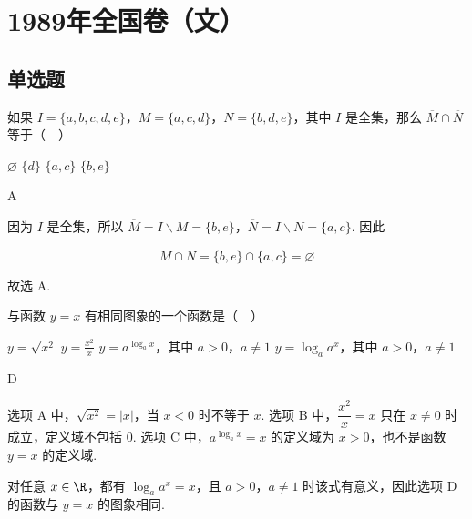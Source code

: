 \documentclass[UTF8,a4paper,oneside,11pt]{ctexbook}
\begin{document}
\mainmatter

\chapter{1989年全国卷（文）}

\section{单选题}

\begin{problem}
如果 \(I = \{a, b, c, d, e\}\)，\(M = \{a, c, d\}\)，\(N = \{b, d, e\}\)，其中 \(I\) 是全集，那么 \(\overline{M} \cap \overline{N}\) 等于（\(\quad\)）

\choices
    {\(\varnothing\)}
    {\(\{d\}\)}
    {\(\{a, c\}\)}
    {\(\{b, e\}\)}
\end{problem}

\begin{answer}
A
\end{answer}

\begin{solution}
因为 \(I\) 是全集，所以 \(\overline{M}=I\mathbin{\backslash}M=\{b,e\}\)，\(\overline{N}=I\mathbin{\backslash}N=\{a,c\}\). 因此

\[\overline{M}\cap\overline{N}=\{b,e\}\cap\{a,c\}=\varnothing\]

故选 A.
\end{solution}

\begin{problem}
与函数 \(y = x\) 有相同图象的一个函数是（\(\quad\)）

\choices
    {\(y = \sqrt{x^2}\)}
    {\(y = \frac{x^2}{x}\)}
    {\(y = a^{\log_a x}\)，其中 \(a > 0\)，\(a \neq 1\)}
    {\(y = \log_a a^x\)，其中 \(a > 0\)，\(a \neq 1\)}
\end{problem}

\begin{answer}
D
\end{answer}

\begin{solution}
选项 A 中，\(\sqrt{x^2}=|x|\)，当 \(x<0\) 时不等于 \(x\). 选项 B 中，\(\dfrac{x^2}{x}=x\) 只在 \(x\neq0\) 时成立，定义域不包括 \(0\). 选项 C 中，\(a^{\log_a x}=x\) 的定义域为 \(x>0\)，也不是函数 \(y=x\) 的定义域.

对任意 \(x\in\R\)，都有 \(\log_a a^x=x\)，且 \(a>0\)，\(a\neq1\) 时该式有意义，因此选项 D 的函数与 \(y=x\) 的图象相同.
\end{solution}
\end{document}

